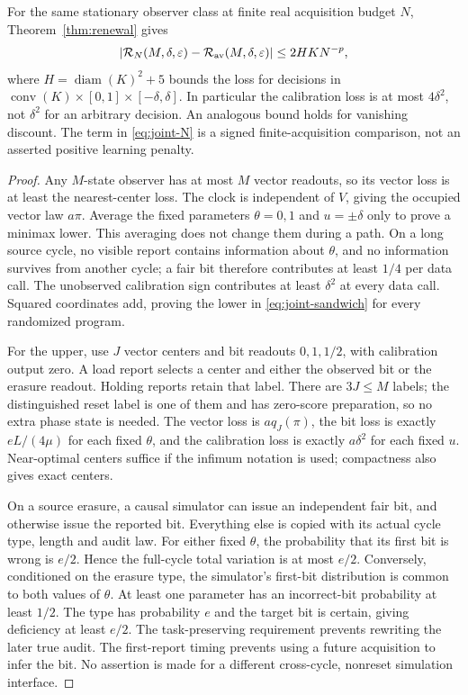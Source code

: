 \begin{proposition}
For the same stationary observer class at finite real acquisition budget $N$, Theorem~\ref{thm:renewal} gives
\begin{equation}\label{eq:joint-N}
 |\mathcal R_N(M,\delta,\varepsilon)-\mathcal R_{\mathrm{av}}(M,\delta,\varepsilon)|
 \le 2HK N^{-p},
\end{equation}
where $H=\operatorname{diam}(K)^2+5$ bounds the loss for decisions in $\operatorname{conv}(K)\times[0,1]\times[-\delta,\delta]$. In particular the calibration loss is at most $4\delta^2$, not $\delta^2$ for an arbitrary decision. An analogous bound holds for vanishing discount. The term in \eqref{eq:joint-N} is a signed finite-acquisition comparison, not an asserted positive learning penalty.
\end{proposition}
\begin{proof}
Any $M$-state observer has at most $M$ vector readouts, so its vector loss is at least the nearest-center loss. The clock is independent of $V$, giving the occupied vector law $a\pi$. Average the fixed parameters $\theta=0,1$ and $u=\pm\delta$ only to prove a minimax lower. This averaging does not change them during a path. On a long source cycle, no visible report contains information about $\theta$, and no information survives from another cycle; a fair bit therefore contributes at least $1/4$ per data call. The unobserved calibration sign contributes at least $\delta^2$ at every data call. Squared coordinates add, proving the lower in \eqref{eq:joint-sandwich} for every randomized program.

For the upper, use $J$ vector centers and bit readouts $0,1,1/2$, with calibration output zero. A load report selects a center and either the observed bit or the erasure readout. Holding reports retain that label. There are $3J\le M$ labels; the distinguished reset label is one of them and has zero-score preparation, so no extra phase state is needed. The vector loss is $a q_J(\pi)$, the bit loss is exactly $eL/(4\mu)$ for each fixed $\theta$, and the calibration loss is exactly $a\delta^2$ for each fixed $u$. Near-optimal centers suffice if the infimum notation is used; compactness also gives exact centers.

On a source erasure, a causal simulator can issue an independent fair bit, and otherwise issue the reported bit. Everything else is copied with its actual cycle type, length and audit law. For either fixed $\theta$, the probability that its first bit is wrong is $e/2$. Hence the full-cycle total variation is at most $e/2$. Conversely, conditioned on the erasure type, the simulator's first-bit distribution is common to both values of $\theta$. At least one parameter has an incorrect-bit probability at least $1/2$. The type has probability $e$ and the target bit is certain, giving deficiency at least $e/2$. The task-preserving requirement prevents rewriting the later true audit. The first-report timing prevents using a future acquisition to infer the bit. No assertion is made for a different cross-cycle, nonreset simulation interface.


\end{proof}
